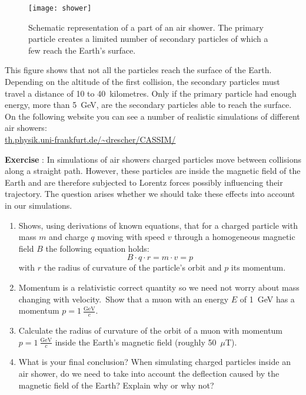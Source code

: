 \begin{figure}\begin{center}
\texttt{[image: shower]}%
\caption{Schematic representation of a part of an air shower. The primary particle creates a limited number of secondary particles of which a few reach the Earth's surface.}\label{fig:shower}
\end{center}\end{figure}

This figure shows that not all the particles reach the surface of the Earth. Depending on the altitude of the first collision, the secondary particles must travel a distance of 10 to 40~kilometres. Only if the primary particle had enough energy, more than 5~GeV, are the secondary particles able to reach the surface. On the following website you can see a number of realistic simulations of different air showers:\\
\url{th.physik.uni-frankfurt.de/\~drescher/CASSIM/}

\begin{shaded}
\textbf{Exercise \theExercise {}} : In simulations of air showers charged particles move between collisions along a straight path. However, these particles are inside the magnetic field of the Earth and are therefore subjected to Lorentz forces possibly influencing their trajectory. The question arises whether we should take these effects into account in our simulations.
\begin{enumerate}[-]
\item Shows, using derivations of known equations, that for a charged particle with mass $m$ and charge $q$ moving with speed $v$ through a homogeneous magnetic field $B$ the following equation holds:
\begin{equation}
B \cdot q \cdot r = m \cdot v = p
\end{equation}
with $r$ the radius of curvature of the particle's orbit and $p$ its momentum.
\item Momentum is a relativistic correct quantity so we need not worry about mass changing with velocity.\footnotemark~Show that a muon with an energy $E$ of 1~GeV has a momentum $p=1~\frac{\mbox{GeV}}{c}$.
\item Calculate the radius of curvature of the orbit of a muon with momentum $p=1~\frac{\mbox{GeV}}{c}$ inside the Earth's magnetic field (roughly 50~$\mu$T).
\item What is your final conclusion? When simulating charged particles inside an air shower, do we need to take into account the deflection caused by the magnetic field of the Earth? Explain why or why not?
\end{enumerate}\end{shaded}

